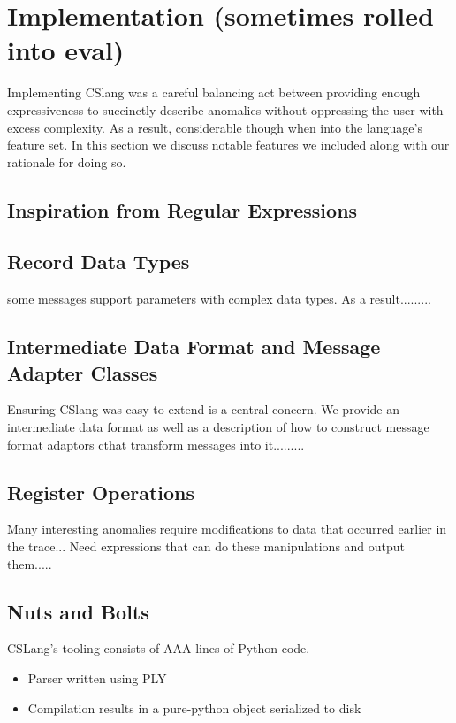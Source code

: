 \section{Implementation (sometimes rolled into eval)}
\label{SEC:implementation}

Implementing CSlang was a careful balancing act between providing enough
expressiveness to succinctly describe anomalies without oppressing the user
with excess complexity.  As a result, considerable though when into the
language's feature set.  In this section we discuss notable features we
included along with our rationale for doing so.

\subsection{Inspiration from Regular Expressions}


\subsection{Record Data Types}

some messages support parameters with complex data types.  As a
result.........

\subsection{Intermediate Data Format and Message Adapter Classes}

Ensuring CSlang was easy to extend is a central concern.  We provide an
intermediate data format as well as a description of how to construct
message format adaptors cthat transform messages into it.........

\subsection{Register Operations}

Many interesting anomalies require modifications to data that occurred
earlier in the trace...  Need expressions that can do these manipulations
and output them.....


\subsection{Nuts and Bolts}
CSLang's tooling consists of AAA lines of Python code.
\begin{itemize}
\item{Parser written using PLY}
\item{Compilation results in a pure-python object serialized to disk}
\end{itemize}

